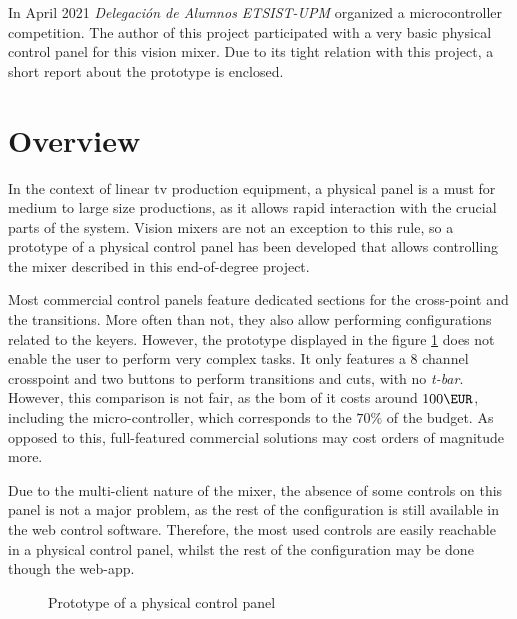 \documentclass[../main.tex]{subfiles}
\begin{document}
\label{chap:control}

In April 2021 \textit{Delegación de Alumnos ETSIST-UPM} organized a microcontroller competition. The author of this project participated with a very basic physical control panel for this vision mixer. Due to its tight relation with this project, a short report about the prototype is enclosed.\newline

\section{Overview}
In the context of linear \gls{tv} production equipment, a physical panel is a must for medium to large size productions, as it allows rapid interaction with the crucial parts of the system. Vision mixers are not an exception to this rule, so a prototype of a physical control panel has been developed that allows controlling the mixer described in this end-of-degree project.\newline


Most commercial control panels feature dedicated sections for the cross-point and the transitions. More often than not, they also allow performing configurations related to the keyers. However, the prototype displayed in the figure \ref{fig:control_panel_proto} does not enable the user to perform very complex tasks. It only features a 8 channel crosspoint and two buttons to perform transitions and cuts, with no \textit{t-bar}. However, this comparison is not fair, as the \gls{bom} of it costs around $100 \si{\EUR}$, including the micro-controller, which corresponds to the $70 \si{\%}$ of the budget. As opposed to this, full-featured commercial solutions may cost orders of magnitude more.\newline

Due to the multi-client nature of the mixer, the absence of some controls on this panel is not a major problem, as the rest of the configuration is still available in the web control software. Therefore, the most used controls are easily reachable in a physical control panel, whilst the rest of the configuration may be done though the web-app.\newline

\begin{figure}[hbtp]
    \centering

    \caption{Prototype of a physical control panel}
    \label{fig:control_panel_proto}
\end{figure}
\end{document}
